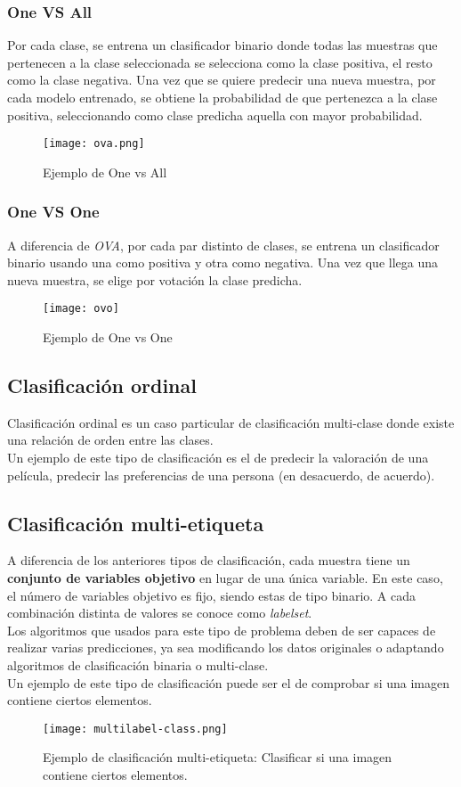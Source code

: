 \subsubsection*{One VS All}
Por cada clase, se entrena un clasificador binario donde todas las muestras que pertenecen a la clase seleccionada se selecciona como la clase positiva, el resto como la clase negativa. Una vez que se quiere predecir una nueva muestra, por cada modelo entrenado, se obtiene la probabilidad de que pertenezca a la clase positiva, seleccionando como clase predicha aquella con mayor probabilidad.
\begin{figure}[H]
	\centering
	\texttt{[image: ova.png]}
	\caption{Ejemplo de One vs All}
	\label{fig:ova}
\end{figure}
\subsubsection*{One VS One}
A diferencia de \textit{OVA}, por cada par distinto de clases, se entrena un clasificador binario usando una como positiva y otra como negativa. Una vez que llega una nueva muestra, se elige por votación la clase predicha.
\begin{figure}[H]
	\centering
	\texttt{[image: ovo]}
	\caption{Ejemplo de One vs One}
	\label{fig:ovo}
\end{figure}
\subsection*{Clasificación ordinal}
Clasificación ordinal es un caso particular de clasificación multi-clase donde existe una relación de orden entre las clases.\\
Un ejemplo de este tipo de clasificación es el de predecir la valoración de una película, predecir las preferencias de una persona (en desacuerdo, de acuerdo).
\subsection*{Clasificación multi-etiqueta}
A diferencia de los anteriores tipos de clasificación, cada muestra tiene un \textbf{conjunto de variables objetivo} en lugar de una única variable. En este caso, el número de variables objetivo es fijo, siendo estas de tipo binario. A cada combinación distinta de valores se conoce como \textit{labelset}.\\
Los algoritmos que usados para este tipo de problema deben de ser capaces de realizar varias predicciones, ya sea modificando los datos originales o adaptando algoritmos de clasificación binaria o multi-clase.\\
\linebreak
Un ejemplo de este tipo de clasificación puede ser el de comprobar si una imagen contiene ciertos elementos.
\begin{figure}[H]
	\centering
	\texttt{[image: multilabel-class.png]}
	\caption{Ejemplo de clasificación multi-etiqueta: Clasificar si una imagen contiene ciertos elementos.}
	\label{fig:mlclasss}
\end{figure}

